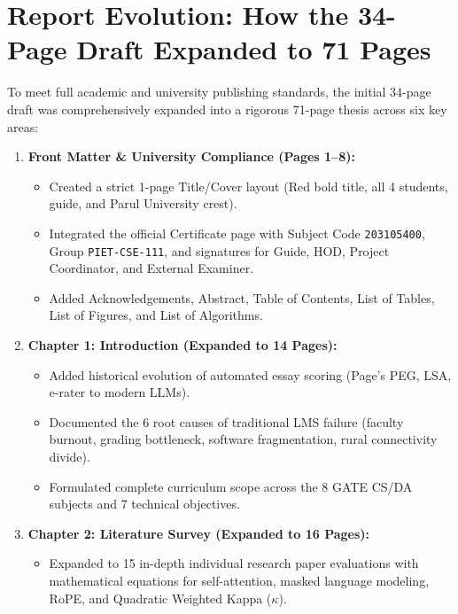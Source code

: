 \documentclass[11pt,a4paper]{article}
\begin{document}
\section{Report Evolution: How the 34-Page Draft Expanded to 71 Pages}
To meet full academic and university publishing standards, the initial 34-page draft was comprehensively expanded into a rigorous 71-page thesis across six key areas:

\begin{enumerate}[leftmargin=*]
    \item \textbf{Front Matter \& University Compliance (Pages 1--8):}
    \begin{itemize}
        \item Created a strict 1-page Title/Cover layout (Red bold title, all 4 students, guide, and Parul University crest).
        \item Integrated the official Certificate page with Subject Code \texttt{203105400}, Group \texttt{PIET-CSE-111}, and signatures for Guide, HOD, Project Coordinator, and External Examiner.
        \item Added Acknowledgements, Abstract, Table of Contents, List of Tables, List of Figures, and List of Algorithms.
    \end{itemize}
    \item \textbf{Chapter 1: Introduction (Expanded to 14 Pages):}
    \begin{itemize}
        \item Added historical evolution of automated essay scoring (Page's PEG, LSA, e-rater to modern LLMs).
        \item Documented the 6 root causes of traditional LMS failure (faculty burnout, grading bottleneck, software fragmentation, rural connectivity divide).
        \item Formulated complete curriculum scope across the 8 GATE CS/DA subjects and 7 technical objectives.
    \end{itemize}
    \item \textbf{Chapter 2: Literature Survey (Expanded to 16 Pages):}
    \begin{itemize}
        \item Expanded to 15 in-depth individual research paper evaluations with mathematical equations for self-attention, masked language modeling, RoPE, and Quadratic Weighted Kappa ($\kappa$).

\end{itemize}
\end{enumerate}
\end{document}
